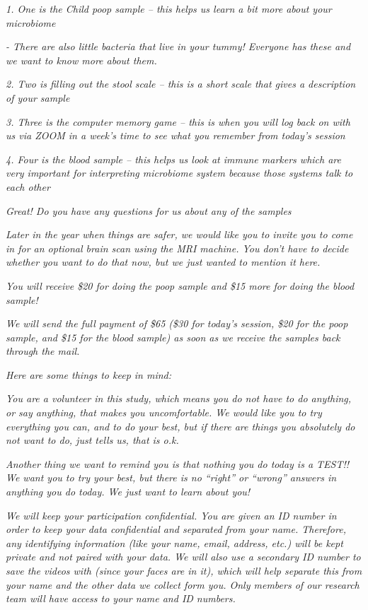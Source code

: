 \documentclass[]{book}
\begin{document}
\emph{1. One is the Child poop sample -- this helps us learn a bit more about your microbiome}

\emph{- There are also little bacteria that live in your tummy! Everyone has these and we want to know more about them.}

\emph{2. Two is filling out the stool scale -- this is a short scale that gives a description of your sample}

\emph{3. Three is the computer memory game -- this is when you will log back on with us via ZOOM in a week's time to see what you remember from today's session}

\emph{4. Four is the blood sample -- this helps us look at immune markers which are very important for interpreting microbiome system because those systems talk to each other}

\emph{Great! Do you have any questions for us about any of the samples}

\emph{Later in the year when things are safer, we would like you to invite you to come in for an optional brain scan using the MRI machine. You don't have to decide whether you want to do that now, but we just wanted to mention it here.}

\emph{You will receive \$20 for doing the poop sample and \$15 more for doing the blood sample!}

\emph{We will send the full payment of \$65 (\$30 for today's session, \$20 for the poop sample, and \$15 for the blood sample) as soon as we receive the samples back through the mail.}

\emph{Here are some things to keep in mind:}

\emph{You are a volunteer in this study, which means you do not have to do anything, or say anything, that makes you uncomfortable. We would like you to try everything you can, and to do your best, but if there are things you absolutely do not want to do, just tells us, that is o.k.}

\emph{Another thing we want to remind you is that nothing you do today is a TEST!! We want you to try your best, but there is no ``right'' or ``wrong'' answers in anything you do today. We just want to learn about you!}

\emph{We will keep your participation confidential. You are given an ID number in order to keep your data confidential and separated from your name. Therefore, any identifying information (like your name, email, address, etc.) will be kept private and not paired with your data. We will also use a secondary ID number to save the videos with (since your faces are in it), which will help separate this from your name and the other data we collect form you. Only members of our research team will have access to your name and ID numbers.}
\end{document}
